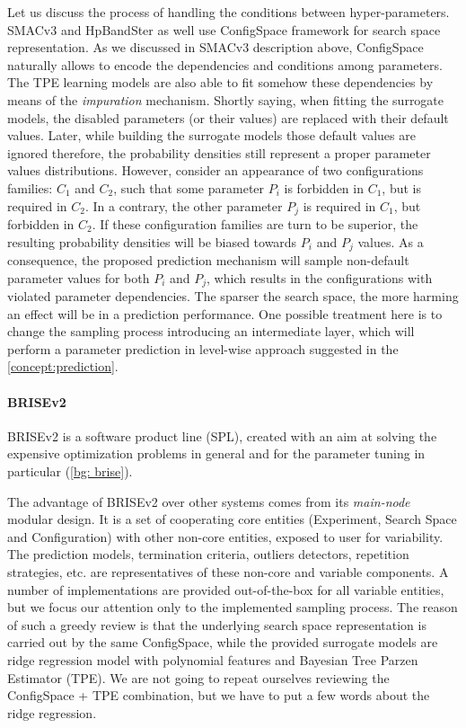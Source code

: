 Let us discuss the process of handling the conditions between hyper-parameters. SMACv3 and HpBandSter as well use ConfigSpace framework for search space representation. As we discussed in SMACv3 description above, ConfigSpace naturally allows to encode the dependencies and conditions among parameters. The TPE learning models are also able to fit somehow these dependencies by means of the \emph{impuration} mechanism\cite{levesque2017bayesian}. Shortly saying, when fitting the surrogate models, the disabled parameters (or their values) are replaced with their default values. Later, while building the surrogate models those default values are ignored therefore, the probability densities still represent a proper parameter values distributions. However, consider an appearance of two configurations families: $C_1$ and $C_2$, such that some parameter $P_i$ is forbidden in $C_1$, but is required in $C_2$. In a contrary, the other parameter $P_j$ is required in $C_1$, but forbidden in $C_2$. If these configuration families are turn to be superior, the resulting probability densities will be biased towards $P_i$ and $P_j$ values. As a consequence, the proposed prediction mechanism will sample non-default parameter values for both $P_i$ and $P_j$, which results in the configurations with violated parameter dependencies. The sparser the search space, the more harming an effect will be in a prediction performance. One possible treatment here is to change the sampling process introducing an intermediate layer, which will perform a parameter prediction in level-wise approach suggested in the \cref{concept:prediction}.

\paragraph{BRISEv2}
BRISEv2 is a software product line (SPL), created with an aim at solving the expensive optimization problems in general and for the parameter tuning in particular (\cref{bg: brise}).

The advantage of BRISEv2 over other systems comes from its \emph{main-node} modular design. It is a set of cooperating core entities (Experiment, Search Space and Configuration) with other non-core entities, exposed to user for variability. The prediction models, termination criteria, outliers detectors, repetition strategies, etc. are representatives of these non-core and variable components. A number of implementations are provided out-of-the-box for all variable entities, but we focus our attention only to the implemented sampling process. The reason of such a greedy review is that the underlying search space representation is carried out by the same ConfigSpace, while the provided surrogate models are ridge regression model with polynomial features and Bayesian Tree Parzen Estimator (TPE). We are not going to repeat ourselves reviewing the ConfigSpace + TPE combination, but we have to put a few words about the ridge regression.

